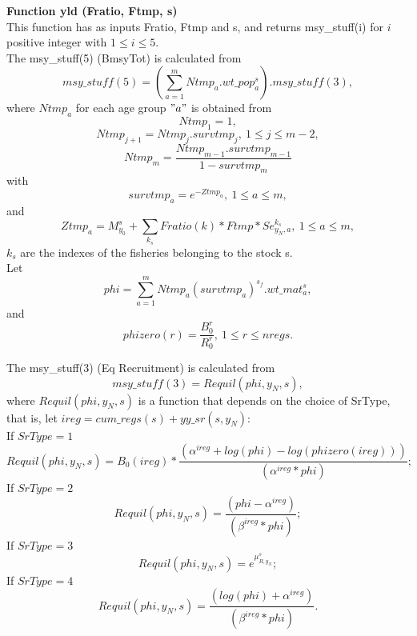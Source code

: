 \documentclass{article}
\begin{document}
\textbf{Function yld (Fratio, Ftmp, s)}\\

This function has as inputs Fratio, Ftmp and s, and returns msy\_stuff(i) for $i$ positive integer with $1\leq i \leq 5$. \\

The msy\_stuff(5) (BmsyTot) is calculated from
\begin{equation}
    msy\_stuff(5)=\left(\sum_{a=1}^m Ntmp_a.wt\_pop^s_a\right).msy\_stuff(3),
\end{equation}
where $Ntmp_a$ for each age group $"a"$ is obtained from 
\begin{equation}
    Ntmp_1=1,
\end{equation}
\begin{equation}
    Ntmp_{j+1}=Ntmp_j.survtmp_j, \ 1\leq j \leq m-2,
\end{equation}
\begin{equation}
    Ntmp_m=\dfrac{Ntmp_{m-1}.survtmp_{m-1}}{1-survtmp_m}
\end{equation}
with
\begin{equation}
    survtmp_a=e^{-Ztmp_a}, \ 1\leq a \leq m,
\end{equation}
and
\begin{equation}
    Ztmp_a=M^s_{y_0}+\sum_{k_s}Fratio(k)*Ftmp*Se^{k_s}_{y_N,a}, \ 1\leq a \leq m, 
\end{equation}
$k_s$ are the indexes of the fisheries belonging to the stock s.\\

Let 
\begin{equation}
    phi= \sum_{a=1}^m Ntmp_a(survtmp_a)^{s_f}.wt\_mat^s_a,
\end{equation}
and 
\begin{equation}
    phizero(r)=\dfrac{B_0^r}{R_0^r}, \ 1\leq r \leq nregs.
\end{equation}


The msy\_stuff(3) (Eq Recruitment) is calculated from
\begin{equation}
    msy\_stuff(3)  = Requil(phi,y_N,s),
\end{equation}
where $Requil(phi,y_N,s)$ is a function that depends on the choice of SrType, that is, let $ireg=cum\_regs(s)+yy\_sr(s,y_N)$:\\
If $SrType=1$
\begin{equation}
    Requil(phi,y_N,s)=B_0(ireg) * \dfrac{(\alpha^{ireg} + log(phi) - log(phizero(ireg)) )}  {(\alpha^{ireg}*phi)};
\end{equation}
If $SrType=2$
\begin{equation}
Requil(phi,y_N,s)=\dfrac{(phi-\alpha^{ireg})}{(\beta^{ireg}*phi)};
\end{equation}
If $SrType=3$
\begin{equation}
    Requil(phi,y_N,s)=e^{\mu^s_{R,y_N}};
\end{equation}
If $SrType=4$
\begin{equation}
    Requil(phi,y_N,s)=\dfrac{(log(phi)+\alpha^{ireg})}{(\beta^{ireg}*phi)}.
\end{equation}
\end{document}
